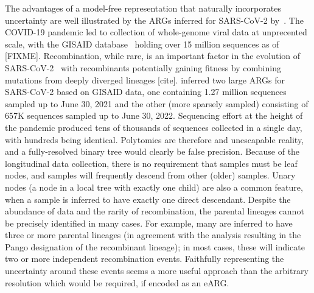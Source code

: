 \documentclass{article}
\begin{document}
The advantages of a model-free representation that naturally
incorporates uncertainty are well illustrated by the
ARGs inferred for SARS-CoV-2 by~\cite{zhan2023towards}.
The COVID-19 pandemic led to collection of whole-genome viral data
at unprecented scale, with the GISAID database~\citep{shu2017gisaid}
holding over 15 million sequences as of [FIXME].
Recombination, while rare, is an important
factor in the evolution of
SARS-CoV-2~\citep{vaninsberghe2021recombinant,jackson2021generation,ignatieva2022ongoing}
with recombinants potentially gaining fitness by combining
mutations from deeply diverged lineages [cite].
\citet{zhan2023towards} inferred two large ARGs for SARS-CoV-2 based
on GISAID data, one containing 1.27 million sequences sampled up to
June 30, 2021 and the other (more sparsely sampled) consisting of
657K sequences sampled up to June 30, 2022.
Sequencing effort at the height of the pandemic produced
tens of thousands of sequences collected in a single day,
with hundreds being identical.
Polytomies are therefore and unescapable reality, and a
fully-resolved binary tree would clearly be false precision.
Because of the longitudinal data collection, there is no
requirement that samples must be leaf nodes, and samples
will frequently descend from other (older) samples.
Unary nodes (a node in a local tree with exactly one child)
are also a common feature, when a sample is inferred to have
exactly one direct descendant.
Despite the abundance of data and the rarity of recombination,
the parental lineages cannot be precisely identified
in many cases. For example, many are inferred to have three
or more parental lineages (in agreement with the
analysis resulting in the Pango designation of the recombinant
lineage); in most cases, these will indicate two or more
independent recombination events.
Faithfully representing the uncertainty
around these events seems a more useful approach than
the arbitrary resolution which would be required,
if encoded as an eARG.

\end{document}
